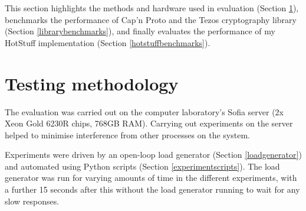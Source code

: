 



This section highlights the methods and hardware used in evaluation (Section \ref{testingmethods}), benchmarks the performance of Cap'n Proto and the Tezos cryptography library (Section \ref{librarybenchmarks}), and finally evaluates the performance of my HotStuff implementation (Section \ref{hotstuffbenchmarks}).

\section{Testing methodology} \label{testingmethods}
The evaluation was carried out on the computer laboratory's Sofia server (2x Xeon Gold 6230R chips, 768GB RAM). Carrying out experiments on the server helped to minimise interference from other processes on the system.

Experiments were driven by an open-loop load generator (Section \ref{loadgenerator}) and automated using Python scripts (Section \ref{experimentscripts}). The load generator was run for varying amounts of time in the different experiments, with a further 15 seconds after this without the load generator running to wait for any slow responses.

